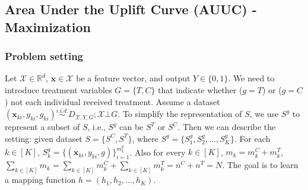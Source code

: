 \documentclass{article}
\def\sR{\mathbb{R}}
\def\vx{{\mathbf{x}}}
\begin{document}
\subsection{Area Under the Uplift Curve (AUUC) - Maximization}
\label{pro:AUUC-all-appendix}
\subsubsection{Problem setting}
Let $\mathcal{X} \in \sR^d$, $\vx \in \mathcal{X}$ be a feature vector, and output $Y \in \{0,1\}$. We need to introduce treatment variables $G=\{T,C\}$ that indicate whether ($g = T$) or ($g = C$) not each individual received treatment. Assume a dataset $(\vx_{ki},y_{ki},g_{ki}) \overset{i.i.d.}{\sim} D_{\mathcal{X},Y,G}; \mathcal{X} \bot G$. To simplify the representation of $S$, we use $S^g$ to represent a subset of $S$, i.e., $S^g$ can be $S^T$ or $S^C$. Then we can describe the setting: given dataset $S = \{S^C, S^T\}$, where $S^g = \{ S^g_1,S^g_2,...,S^g_K \}$. For each $k \in [K]$, $S^g_k = \{ 
(\vx_{ki}, y_{ki}, g) \}_{i=1}^{m^g_k}$. Also for every $k \in [K]$, $m_k = m^C_k + m^T_k$, $\sum_{k \in [K]} m_k = \sum_{k \in [K]} m_k^C + \sum_{k \in [K]} m_k^T = n^C +n^T = N$. The goal is to learn a mapping function $h= (h_1,h_2,...,h_K)$. 

\end{document}
